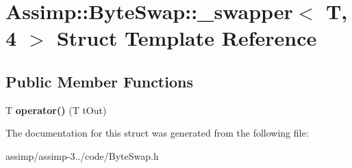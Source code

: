 \hypertarget{struct_assimp_1_1_byte_swap_1_1__swapper_3_01_t_00_014_01_4}{\section{Assimp\+:\+:Byte\+Swap\+:\+:\+\_\+swapper$<$ T, 4 $>$ Struct Template Reference}
\label{struct_assimp_1_1_byte_swap_1_1__swapper_3_01_t_00_014_01_4}
}
\subsection*{Public Member Functions}
\begin{DoxyCompactItemize}
\item 
\hypertarget{struct_assimp_1_1_byte_swap_1_1__swapper_3_01_t_00_014_01_4_a23f16e0b274b4a75e9bca7d0f4490e4c}{T {\bfseries operator()} (T t\+Out)}\label{struct_assimp_1_1_byte_swap_1_1__swapper_3_01_t_00_014_01_4_a23f16e0b274b4a75e9bca7d0f4490e4c}

\end{DoxyCompactItemize}


The documentation for this struct was generated from the following file\+:\begin{DoxyCompactItemize}
\item 
assimp/assimp-\/3../code/Byte\+Swap.\+h\end{DoxyCompactItemize}
